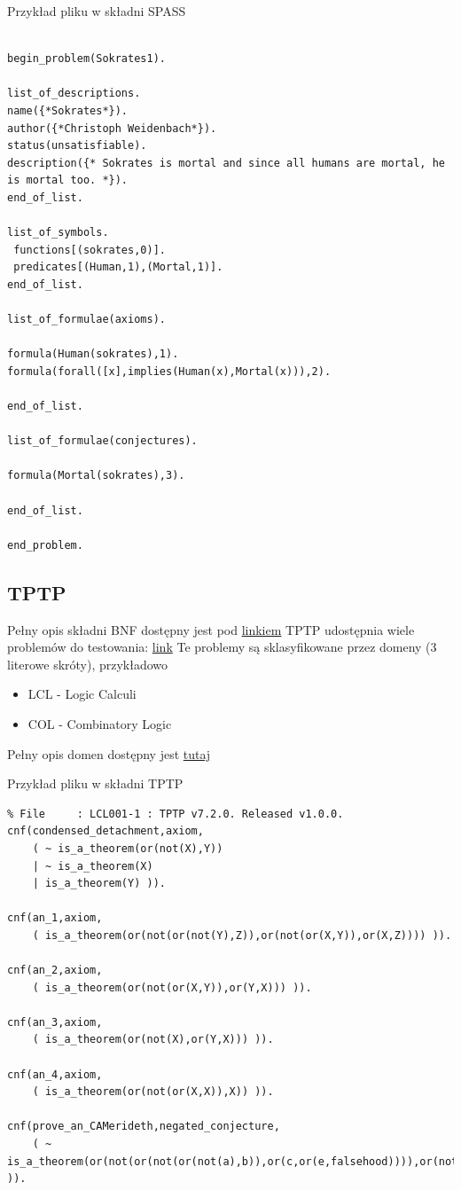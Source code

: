 \documentclass[a4paper,12pt]{article}
\begin{document}
Przykład pliku w składni SPASS
\begin{verbatim}

begin_problem(Sokrates1).

list_of_descriptions.
name({*Sokrates*}).
author({*Christoph Weidenbach*}).
status(unsatisfiable).
description({* Sokrates is mortal and since all humans are mortal, he is mortal too. *}).
end_of_list.

list_of_symbols.
 functions[(sokrates,0)].
 predicates[(Human,1),(Mortal,1)].
end_of_list.

list_of_formulae(axioms).

formula(Human(sokrates),1).
formula(forall([x],implies(Human(x),Mortal(x))),2).

end_of_list.

list_of_formulae(conjectures).

formula(Mortal(sokrates),3).

end_of_list.

end_problem.
\end{verbatim}

\subsection{TPTP}
\noindent Pełny opis składni BNF dostępny jest pod
\href{http://www.tptp.org/TPTP/SyntaxBNF.html}{linkiem} \newline
TPTP udostępnia wiele problemów do testowania: \href{http://www.tptp.org/cgi-bin/SeeTPTP?Category=Problems}{link} \newline
Te problemy są sklasyfikowane przez domeny (3 literowe skróty), przykładowo
\begin{itemize}
    \item LCL - Logic Calculi
    \item COL - Combinatory Logic
\end{itemize}

\noindent
Pełny opis domen dostępny jest \href{http://www.tptp.org/cgi-bin/SeeTPTP?Category=Documents&File=THFSynopsis}{tutaj}

\noindent
Przykład pliku w składni TPTP

\begin{verbatim}
% File     : LCL001-1 : TPTP v7.2.0. Released v1.0.0.
cnf(condensed_detachment,axiom,
    ( ~ is_a_theorem(or(not(X),Y))
    | ~ is_a_theorem(X)
    | is_a_theorem(Y) )).

cnf(an_1,axiom,
    ( is_a_theorem(or(not(or(not(Y),Z)),or(not(or(X,Y)),or(X,Z)))) )).

cnf(an_2,axiom,
    ( is_a_theorem(or(not(or(X,Y)),or(Y,X))) )).

cnf(an_3,axiom,
    ( is_a_theorem(or(not(X),or(Y,X))) )).

cnf(an_4,axiom,
    ( is_a_theorem(or(not(or(X,X)),X)) )).

cnf(prove_an_CAMerideth,negated_conjecture,
    ( ~ is_a_theorem(or(not(or(not(or(not(a),b)),or(c,or(e,falsehood)))),or(not(or(not(e),a)),or(c,or(falsehood,a))))) )).

\end{verbatim}
\end{document}
